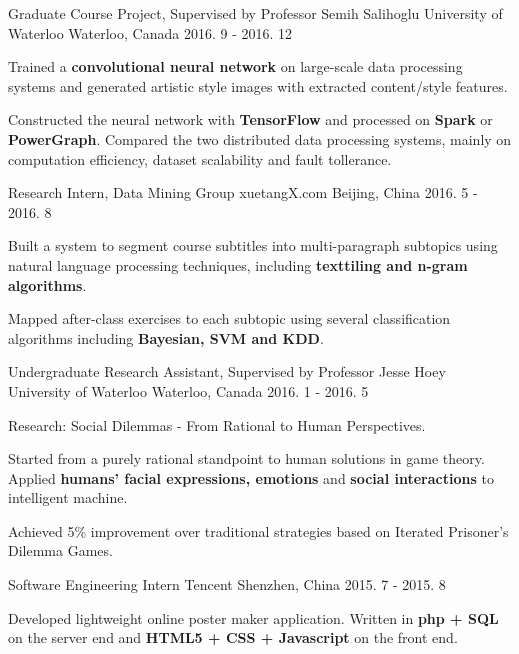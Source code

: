 \begin{cventries}
  \cventry
    {Graduate Course Project, Supervised by Professor Semih Salihoglu}
    {University of Waterloo}
    {Waterloo, Canada}
    {2016. 9 - 2016. 12}
    {
      \begin{cvitems}
          \item{
              Trained a {\bf convolutional neural network} on large-scale data processing systems and generated artistic style images with extracted content/style features.
          }
          \item{
              Constructed the neural network with {\bf TensorFlow} and processed on {\bf Spark} or {\bf PowerGraph}. Compared the two distributed data processing systems, mainly on computation efficiency, dataset scalability and fault tollerance.
          }
      \end{cvitems}
    }
  \cventry
    {Research Intern, Data Mining Group}
    {xuetangX.com}
    {Beijing, China}
    {2016. 5 - 2016. 8}
    {
      \begin{cvitems}
        \item{Built a system to segment course subtitles into multi-paragraph subtopics using natural language processing techniques, including {\bf texttiling and n-gram algorithms}.}
        \item{Mapped after-class exercises to each subtopic using several classification algorithms including {\bf Bayesian, SVM and KDD}.}
      \end{cvitems}
    }
  \cventry
    {Undergraduate Research Assistant, Supervised by Professor Jesse Hoey}
    {University of Waterloo}
    {Waterloo, Canada}
    {2016. 1 - 2016. 5}
    {
      \begin{cvitems}
        \item {Research: Social Dilemmas - From Rational to Human Perspectives.}
        \item {Started from a purely rational standpoint to human solutions in game theory. Applied {\bf humans' facial expressions, emotions} and {\bf social interactions} to intelligent machine.}
        \item {Achieved 5\% improvement over traditional strategies based on Iterated Prisoner's Dilemma Games.}
      \end{cvitems}
    }
  \cventry
    {Software Engineering Intern}
    {Tencent}
    {Shenzhen, China}
    {2015. 7 - 2015. 8}
    {
      \begin{cvitems}
        \item {Developed lightweight online poster maker application. Written in {\bf php + SQL} on the server end and {\bf HTML5 + CSS + Javascript} on the front end.}

\end{cvitems}}
\end{cventries}
